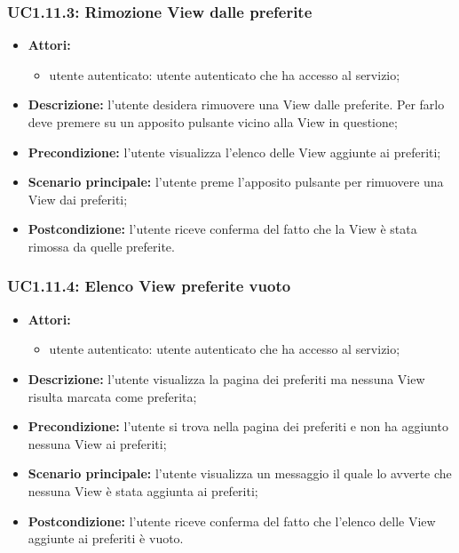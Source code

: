 \subsubsection{UC1.11.3: Rimozione View dalle preferite}
\begin{itemize}
	\item \textbf{Attori:}
	\begin{itemize}
		\item utente autenticato: utente autenticato che ha accesso al servizio;
	\end{itemize}
	\item \textbf{Descrizione:} l'utente desidera rimuovere una View dalle preferite. Per farlo deve premere su un apposito pulsante vicino alla View in questione;
	\item \textbf{Precondizione:} l'utente visualizza l'elenco delle View aggiunte ai preferiti;
	\item \textbf{Scenario principale:} l'utente preme l'apposito pulsante per rimuovere una View dai preferiti;
	\item \textbf{Postcondizione:} l'utente riceve conferma del fatto che la View è stata rimossa da quelle preferite.
\end{itemize}

\subsubsection{UC1.11.4: Elenco View preferite vuoto}
\begin{itemize}
	\item \textbf{Attori:}
	\begin{itemize}
		\item utente autenticato: utente autenticato che ha accesso al servizio;
	\end{itemize}
	\item \textbf{Descrizione:} l'utente visualizza la pagina dei preferiti ma nessuna View risulta marcata come preferita;
	\item \textbf{Precondizione:} l'utente si trova nella pagina dei preferiti e non ha aggiunto nessuna View ai preferiti;
	\item \textbf{Scenario principale:} l'utente visualizza un messaggio il quale lo avverte che nessuna View è stata aggiunta ai preferiti;
	\item \textbf{Postcondizione:} l'utente riceve conferma del fatto che l'elenco delle View aggiunte ai preferiti è vuoto.
\end{itemize}

